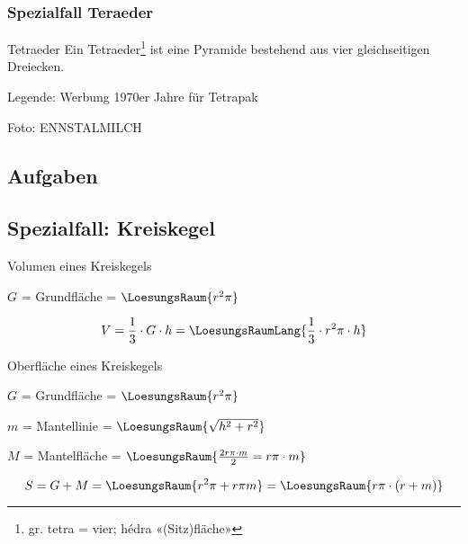 \subsubsection{Spezialfall Teraeder}

\begin{definition}{Tetraeder}{}
  Ein Tetraeder\footnote{gr. tetra = vier; hédra «(Sitz)fläche»} ist
  eine Pyramide bestehend aus vier gleichseitigen Dreiecken.
\end{definition}

\begin{center}{\small{Legende: Werbung 1970er Jahre für Tetrapak}}\end{center}
\begin{center}\tiny{Foto: ENNSTALMILCH}\end{center}
\subsection*{Aufgaben}

\newpage

\subsection{Spezialfall: Kreiskegel}



\begin{gesetz}{Volumen eines Kreiskegels}{}

  $G$ = Grundfläche = $\LoesungsRaum{r^2\pi}$

  $$V = \frac13\cdot{} G\cdot{}h = \LoesungsRaumLang{\frac13 \cdot{} r^2\pi \cdot{} h}$$
\end{gesetz}



\begin{gesetz}{Oberfläche eines Kreiskegels}{}

  $G$ = Grundfläche = $\LoesungsRaum{r^2\pi}$

  $m$ = Mantellinie = $\LoesungsRaum{\sqrt{h^2 + r^2}}$
  
  $M$ = Mantelfläche = $\LoesungsRaum{\frac{2r\pi \cdot{} m}2 = r\pi\cdot{}m}$
  
  $$S = G + M = \LoesungsRaum{r^2\pi + r\pi m} = \LoesungsRaum{r\pi\cdot{}(r+m)}$$
\end{gesetz}


